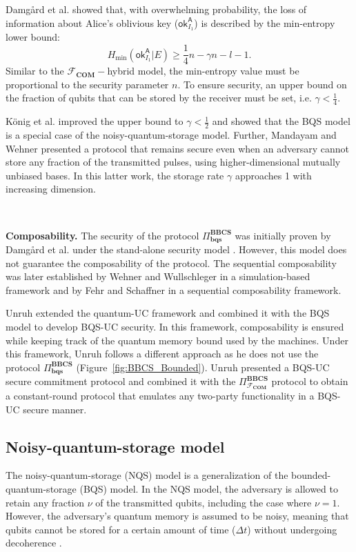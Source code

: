 Damg{\aa}rd et al. \cite{DFRSS07} showed that, with overwhelming probability, the loss of information about Alice's oblivious key ($\mathsf{ok}^{\mathsf{A}}_{I_{1}}$) is described by the min-entropy lower bound:
$$H_{\text{min}}(\mathsf{ok}^{\mathsf{A}}_{I_{1}} | E) \geq \frac{1}{4}n - \gamma n - l - 1.$$
Similar to the $\mathcal{F}_{\textbf{COM}}-$hybrid model, the min-entropy value must be proportional to the security parameter $n$. To ensure security, an upper bound on the fraction of qubits that can be stored by the receiver must be set, i.e. $\gamma < \frac{1}{4}$.

K\"onig et al. \cite{KWW12} improved the upper bound to $\gamma < \frac{1}{2}$ and showed that the BQS model is a special case of the noisy-quantum-storage model. Further, Mandayam and Wehner \cite{MW11} presented a protocol that remains secure even when an adversary cannot store any fraction of the transmitted pulses, using higher-dimensional mutually unbiased bases. In this latter work, the storage rate $\gamma$ approaches 1 with increasing dimension.

\

\noindent\textbf{Composability.} The security of the protocol $\Pi^{\textbf{BBCS}}_{\textbf{bqs}}$ was initially proven by Damg{\aa}rd et al. \cite{DFSS05, DFRSS07} under the stand-alone security model \cite{WW08}. However, this model does not guarantee the composability of the protocol. The sequential composability was later established by Wehner and Wullschleger \cite{WW08} in a simulation-based framework and by Fehr and Schaffner in a sequential composability framework.

Unruh \cite{U11} extended the quantum-UC framework and combined it with the BQS model to develop BQS-UC security. In this framework, composability is ensured while keeping track of the quantum memory bound used by the machines. Under this framework, Unruh follows a different approach as he does not use the protocol $\Pi^{\textbf{BBCS}}_{\textbf{bqs}}$ (Figure~\ref{fig:BBCS_Bounded}). Unruh presented a BQS-UC secure commitment protocol and combined it with the $\Pi^{\textbf{BBCS}}_{\mathcal{F}_{\textbf{COM}}}$ protocol to obtain a constant-round protocol that emulates any two-party functionality in a BQS-UC secure manner.


\subsection{Noisy-quantum-storage model}

The noisy-quantum-storage (NQS) model is a generalization of the bounded-quantum-storage (BQS) model. In the NQS model, the adversary is allowed to retain any fraction $\nu$ of the transmitted qubits, including the case where $\nu = 1$. However, the adversary's quantum memory is assumed to be noisy, meaning that qubits cannot be stored for a certain amount of time ($\Delta t$) without undergoing decoherence \cite{KWW12}. 

